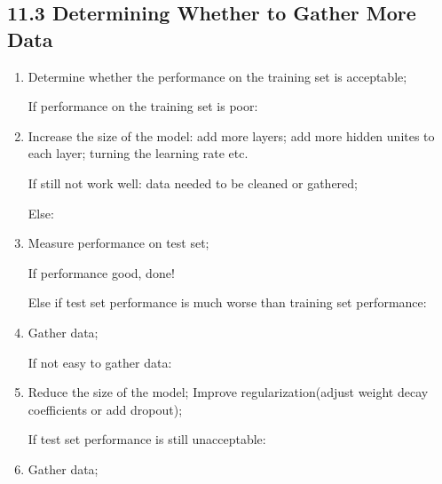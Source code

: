 \documentclass[12pt]{article}
\numberwithin{equation}{section}
\begin{document}
\subsection{11.3 Determining Whether to Gather More Data}
\begin{enumerate}
	\item Determine whether the performance on the training set is acceptable; 
	
	If performance on the training set is poor:
	\item Increase the size of the model: add more layers; add more hidden unites to each layer; turning 
	the learning rate etc.
	
	If still not work well: data needed to be cleaned or gathered;
	
	Else:
	\item Measure performance on test set;
	
	If performance good, done!
	
	Else if test set performance is much worse than training set performance:
	\item Gather data;
	
	If not easy to gather data:
	\item Reduce the size of the model; Improve regularization(adjust weight decay coefficients or add dropout);
	
	If test set performance is still unacceptable:
	\item Gather data;
\end{enumerate}



\renewcommand\refname{Reference}



  \clearpage
\end{document}
